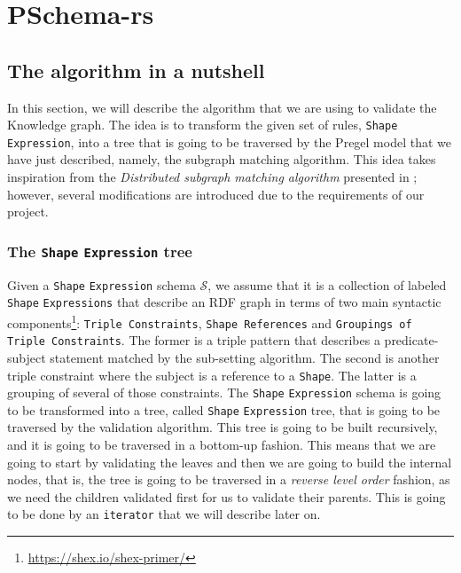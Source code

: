 \begin{code}
    \inputminted{rust}{code/listings/11-1_graph.rs}
\end{code}

\section{PSchema-rs}

\subsection{The algorithm in a nutshell}

In this section, we will describe the algorithm that we are using to validate the Knowledge graph. The idea is to transform the given set of rules, \texttt{Shape} \texttt{Expression}, into a tree that is going to be traversed by the Pregel model that we have just described, namely, the subgraph matching algorithm. This idea takes inspiration from the \textit{Distributed subgraph matching algorithm} presented in \cite{Xu2019}; however, several modifications are introduced due to the requirements of our project.

\subsubsection{The \texttt{Shape} \texttt{Expression} tree}

Given a \texttt{Shape} \texttt{Expression} schema $\mathcal{S}$, we assume that it is a collection of labeled \texttt{Shape} \texttt{Expressions} that describe an RDF graph in terms of two main syntactic components\footnote{\url{https://shex.io/shex-primer/}}: \texttt{Triple Constraints}, \texttt{Shape References} and \texttt{Groupings of Triple Constraints}. The former is a triple pattern that describes a predicate-subject statement matched by the sub-setting algorithm. The second is another triple constraint where the subject is a reference to a \texttt{Shape}. The latter is a grouping of several of those constraints. The \texttt{Shape} \texttt{Expression} schema is going to be transformed into a tree, called \texttt{Shape} \texttt{Expression} tree, that is going to be traversed by the validation algorithm. This tree is going to be built recursively, and it is going to be traversed in a bottom-up fashion. This means that we are going to start by validating the leaves and then we are going to build the internal nodes, that is, the tree is going to be traversed in a \textit{reverse level order} fashion, as we need the children validated first for us to validate their parents. This is going to be done by an \texttt{iterator} that we will describe later on.

